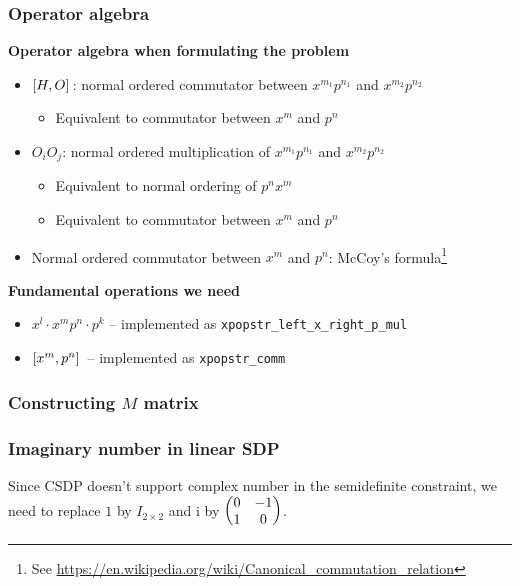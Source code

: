 \documentclass{beamer}
\newcommand{\ii}{\mathrm{i}}
\begin{document}
\begin{frame}
\frametitle{Operator algebra}

\textbf{Operator algebra when formulating the problem}

\begin{itemize}
    \item $\comm*{H}{O}$: normal ordered commutator between $x^{m_1} p^{n_1}$ and $x^{m_2} p^{n_2}$
    \begin{itemize}
        \item Equivalent to commutator between $x^m$ and $p^n$
    \end{itemize}
    \item $O_i O_j$: normal ordered multiplication of $x^{m_1} p^{n_1}$ and $x^{m_2} p^{n_2}$
    \begin{itemize}
        \item Equivalent to normal ordering of $p^{n} x^m$
        \item Equivalent to commutator between $x^m$ and $p^n$
    \end{itemize}
    \item Normal ordered commutator between $x^m$ and $p^n$: McCoy's formula\footnote{See \url{https://en.wikipedia.org/wiki/Canonical_commutation_relation}}
\end{itemize}

\textbf{Fundamental operations we need}

\begin{itemize}
    \item $x^l \cdot x^m p^n \cdot p^k$ -- implemented as \texttt{xpopstr\_left\_x\_right\_p\_mul}
    \item $\comm*{x^m}{p^n}$ -- implemented as \texttt{xpopstr\_comm}
\end{itemize}

\end{frame}

\begin{frame}
\frametitle{Constructing $M$ matrix}

    

\end{frame}

\begin{frame}
\frametitle{Imaginary number in linear SDP}

Since CSDP doesn't support complex number in the semidefinite constraint, we need to 
replace $1$ by $I_{2 \times 2}$ and $\ii$ by $\pmqty{0 & -1 \\ 1 & 0}$.

\end{frame}
\end{document}
